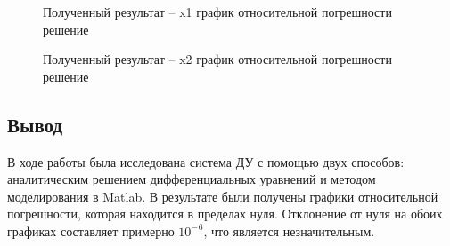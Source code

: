 \documentclass[12pt]{article}
\begin{document}
\begin{figure}[h]
	\caption{Полученный результат -- x1 график относительной погрешности решение}
\end{figure}
\begin{figure}[h]
	\caption{Полученный результат -- x2 график относительной погрешности решение}
\end{figure}
	\clearpage
	 \subsection{Вывод}
	 	В ходе работы была исследована система ДУ с помощью двух способов: аналитическим решением дифференциальных уравнений и методом моделирования в Matlab. В результате были получены графики относительной погрешности, которая находится в пределах нуля. Отклонение от нуля на обоих графиках составляет примерно ${10^-}^6$, что является незначительным.
	\clearpage
\end{document}
